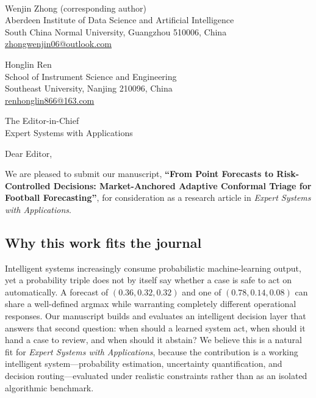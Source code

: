 \documentclass[11pt]{article}
\begin{document}
\\[2pt]

\vspace{1.2em}

\noindent
Wenjin Zhong (corresponding author)\\
Aberdeen Institute of Data Science and Artificial Intelligence\\
South China Normal University, Guangzhou 510006, China\\
\href{mailto:zhongwenjin06@outlook.com}{zhongwenjin06@outlook.com}

\vspace{0.6em}
\noindent
Honglin Ren\\
School of Instrument Science and Engineering\\
Southeast University, Nanjing 210096, China\\
\href{mailto:renhonglin866@163.com}{renhonglin866@163.com}

\vspace{1.2em}

\vspace{0.8em}
\noindent The Editor-in-Chief\\
Expert Systems with Applications

\vspace{1.0em}
\noindent Dear Editor,

\vspace{0.4em}
\noindent We are pleased to submit our manuscript, \textbf{``From Point Forecasts
to Risk-Controlled Decisions: Market-Anchored Adaptive Conformal Triage for
Football Forecasting''}, for consideration as a research article in
\textit{Expert Systems with Applications}.

\subsection*{Why this work fits the journal}

Intelligent systems increasingly consume probabilistic machine-learning
output, yet a probability triple does not by itself say whether a case is safe
to act on automatically. A forecast of $(0.36, 0.32, 0.32)$ and one of
$(0.78, 0.14, 0.08)$ can share a well-defined argmax while warranting
completely different operational responses. Our manuscript builds and
evaluates an intelligent decision layer that answers that second question:
when should a learned system act, when should it hand a case to review, and
when should it abstain? We believe this is a natural fit for
\textit{Expert Systems with Applications}, because the contribution is a
working intelligent system---probability estimation, uncertainty
quantification, and decision routing---evaluated under realistic constraints
rather than as an isolated algorithmic benchmark.
\end{document}
